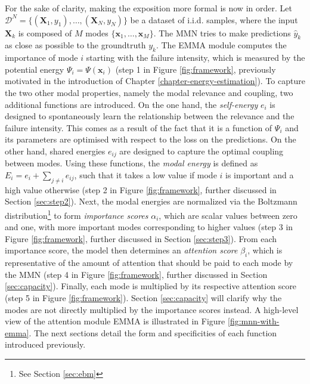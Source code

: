 For the sake of clarity, making the exposition more formal is now in order. Let $\mathcal{D}^{N} = \{(\mathbf{X}_1,  y_1), \ldots, (\mathbf{X}_N, y_N)\}$ be a dataset of i.i.d. samples, where the input $\textbf{X}_k$ is composed of $M$ modes $\{\mathbf{x}_1, \ldots, \mathbf{x}_M\}$. The MMN tries to make predictions $\hat{y}_k$ as close as possible to the groundtruth $y_k$. The EMMA module computes the importance of mode $i$ starting with the failure intensity, which is measured by the potential energy $\Psi_i = \Psi(\mathbf{x}_i)$ (step 1 in Figure \ref{fig:framework}, previously motivated in the introduction of Chapter \ref{chapter-energy-estimation}). To capture the two other modal properties, namely the modal relevance and coupling, two additional functions are introduced. On the one hand, the \textit{self-energy} $e_i$ is designed to spontaneously learn the relationship between the relevance and the failure intensity. This comes as a result of the fact that it is a function of $\Psi_i$ and its parameters are optimised with respect to the loss on the predictions. On the other hand, shared energies $e_{ij}$ are designed to capture the optimal coupling between modes. Using these functions, the \textit{modal energy} is defined as $E_i = e_i + \sum_{j\neq i} e_{ij}$, such that it takes a low value if mode $i$ is important and a high value otherwise (step 2 in Figure \ref{fig:framework}, further discussed in Section \ref{sec:step2}). Next, the modal energies are normalized via the Boltzmann distribution\footnote{See Section \ref{sec:ebm}} to form \textit{importance scores} $\alpha_i$, which are scalar values between zero and one, with more important modes corresponding to higher values (step 3 in Figure \ref{fig:framework}, further discussed in Section \ref{sec:step3}). From each importance score, the model then determines an \textit{attention score} $\beta_i$, which is representative of the amount of attention that should be paid to each mode by the MMN (step 4 in Figure \ref{fig:framework}, further discussed in Section \ref{sec:capacity}). Finally, each mode is multiplied by its respective attention score (step 5 in Figure \ref{fig:framework}). Section \ref{sec:capacity} will clarify why the modes are not directly multiplied by the importance scores instead.  A high-level view of the attention module EMMA is illustrated in Figure \ref{fig:mnn-with-emma}. The next sections detail the form and specificities of each function introduced previously.

